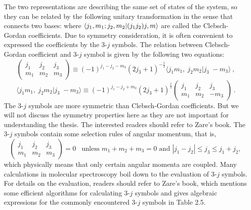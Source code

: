 The two representations are describing the same set of states of the system, so they can be related by the following unitary
transformation in the sense that connects two bases:
where $\langle j_1, m_1; j_2, m_2 | (j_1 j_2)j, m \rangle$ are called the Clebsch-Gordan coefficients. Due to symmetry 
consideration, it is often convenient to expressed the coefficients by the 3-$j$ symbols. The relation between Clebsch-Gordan 
coefficient and 3-$j$ symbol is given by the following two equations:
\begin{equation}
\left( 
\begin{array}{ ccc }
j_{1} & j_{2} & j_{3} \\
m_{1} & m_{2} & m_{3}
\end{array}
\right) \equiv (-1)^{j_{1} - j_{2} - m_{3}} (2j_{3} +1)^{-\frac{1}{2}} \langle j_{1}m_{1}, \; j_{2} m_{2} | j_{3}\; -m_{3}\rangle \ ,
\end{equation}
\begin{equation}
 \langle j_{1}m_{1}, \; j_{2} m_{2} | j_{3}\; -m_{3}\rangle \equiv (-1)^{j_{1} - j_{2} + m_{3}} (2j_{3} +1)^{\frac{1}{2}}
\left( 
\begin{array}{ ccc }
j_{1} & j_{2} & j_{3} \\
m_{1} & m_{2} & -m_{3}
\end{array}
\right)  \ . \label{CG-3j}
\end{equation}
The 3-$j$ symbols are more symmetric than Clebsch-Gordan coefficients. But we will not discuss the symmetry properties here as they are not important for understanding the thesis. The interested readers should refer to Zare's book\cite{zare-book}.  The 3-$j$ symbols contain some selection rules of angular momentum, that is, 
\begin{equation}
\left(
\begin{array}{ccc}
j_{1}&j_{2}&j_{3} \\
m_{1}&m_{2}&m_{3}
\end{array}
\right)
=0 \;\;\; \mbox{unless $m_{1} + m_{2} + m_{3} = 0$ and $|j_1 - j_2| \leq j_3 \leq j_1 + j_2$, } \nonumber 
\end{equation}
which physically means that only certain angular momenta are coupled. Many calculations in molecular spectroscopy boil
down to the evaluation of 3-$j$ symbols. For details on the evaluation, readers should refer to Zare's book\cite{zare-book}, which mentions some efficient algorithms for calculating 3-$j$ 
symbols and gives algebraic expressions for the commonly encountered 3-$j$ symbols in Table 2.5. 
 

